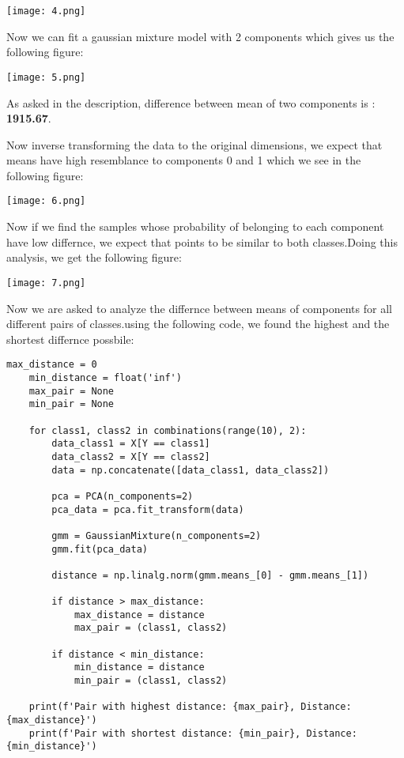\documentclass{article}
\begin{document}
\texttt{[image: 4.png]}

Now we can fit a gaussian mixture model with 2 components which gives us the following figure:

\texttt{[image: 5.png]}

As asked in the description, difference between mean of two components is : \textbf{1915.67}.

Now inverse transforming the data to the original dimensions, we expect that means have high resemblance to components 0 and 1 which 
we see in the following figure:

\texttt{[image: 6.png]}

Now if we find the samples whose probability of belonging to each component have low differnce, we expect that points to be 
similar to both classes.Doing this analysis, we get the following figure:

\texttt{[image: 7.png]}

Now we are asked to analyze the differnce between means of components for all different pairs of classes.using the following code, we found the 
highest and the shortest differnce possbile:

\begin{lstlisting}[style=mystyle]
    max_distance = 0
    min_distance = float('inf')
    max_pair = None
    min_pair = None
    
    for class1, class2 in combinations(range(10), 2):
        data_class1 = X[Y == class1]
        data_class2 = X[Y == class2]
        data = np.concatenate([data_class1, data_class2])
        
        pca = PCA(n_components=2)
        pca_data = pca.fit_transform(data)
        
        gmm = GaussianMixture(n_components=2)
        gmm.fit(pca_data)
        
        distance = np.linalg.norm(gmm.means_[0] - gmm.means_[1])
        
        if distance > max_distance:
            max_distance = distance
            max_pair = (class1, class2)
        
        if distance < min_distance:
            min_distance = distance
            min_pair = (class1, class2)
    
    print(f'Pair with highest distance: {max_pair}, Distance: {max_distance}')
    print(f'Pair with shortest distance: {min_pair}, Distance: {min_distance}')
    
\end{lstlisting}
\end{document}
